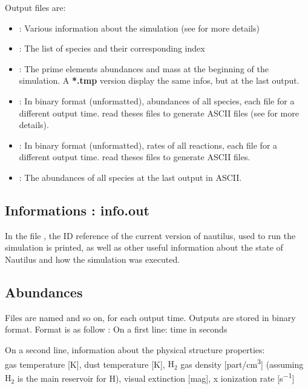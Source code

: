 \documentclass[english,a4paper,twoside]{article}
\newcommand{\molecule}[1]{\ensuremath{\mathrm{#1}}}
\begin{document}
Output files are:
\begin{itemize}
\item {}: Various information about the simulation (see  for more details)
\item {}: The list of species and their corresponding index
\item {}: The prime elements abundances and mass at the beginning of the simulation. A \textbf{*.tmp} version display the same infos, but at the last output.
\item {}: In binary format (unformatted), abundances of all species, each file for a different output time.  read theses files to generate ASCII files (see  for more details).
\item {}: In binary format (unformatted), rates of all reactions, each file for a different output time.  read theses files to generate ASCII files.
\item {}: The abundances of all species at the last output in ASCII.
\end{itemize}

\subsection{Informations : info.out}\label{sec:info-out}
In the file , the ID reference of the current version of nautilus, used to run the simulation is printed, as well as other useful information about the state of Nautilus and how the simulation was executed.

\subsection{Abundances}\label{sec:abundances}
Files are named  and so on, for each output time. Outputs are stored in binary format. Format is as follow : 
On a first line: time in seconds

On a second line, information about the physical structure properties: \\
gas temperature [\unit{K}], dust temperature [\unit{K}], \molecule{H_2} gas density [\unit{part/cm^3}] (assuming \molecule{H_2} is the main reservoir for H), visual extinction [\unit{mag}], x ionization rate [\unit{s^{-1}}]
\end{document}
